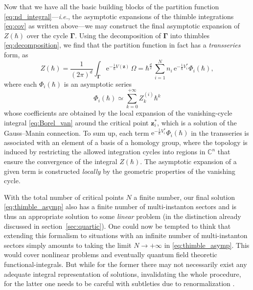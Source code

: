 \documentclass[11pt,a4paper]{article}
\def\BC{{\mathbb C}}
\newcommand{\be}{\begin{equation}}
\newcommand{\ee}{\end{equation}}
\newcommand{\rme}{{\mathrm{e}}}
\begin{document}
Now that we have all the basic building blocks of the partition function \eqref{eq:nd_integral}---\textit{i.e.}, the asymptotic expansions of the thimble integrations \eqref{eq:cov} as written above---we may construct the final asymptotic expansion of $Z (\hbar)$ over the cycle $\boldsymbol{\Gamma}$. Using the decomposition of $\boldsymbol{\Gamma}$ into thimbles \eqref{eq:decomposition}, we find that the partition function in fact has a \textit{transseries} form, as
%
\be
\label{eq:thimble_asymp}
Z (\hbar) = \frac{1}{\left( 2\pi \right)^d} \int_{\boldsymbol{\Gamma}} \rme^{- \frac{1}{\hbar} V(\boldsymbol{z})}\, \Omega = \hbar^{\frac{d}{2}}\, \sum_{i=1}^N n_i\, \rme^{- \frac{1}{\hbar} V^*_i} \Phi_i(\hbar),
\ee
%
\noindent
where each $\Phi_i(\hbar)$ is an asymptotic series
%
\be
\Phi_i (\hbar) \simeq \sum_{k=0}^{+\infty} Z^{(i)}_k \hbar^{k}
\ee
%
\noindent
whose coefficients are obtained by the local expansion of the vanishing-cycle integral \eqref{eq:Borel_van} around the critical point $\boldsymbol{z}^*_i$, which is a solution of the Gauss--Manin connection. To sum up, each term $\rme^{- \frac{1}{\hbar} V^*_i} \Phi_i(\hbar)$ in the transseries is associated with an element of a basis of a homology group, where the topology is induced by restricting the allowed integration cycles into regions in $\BC^n$ that ensure the convergence of the integral $Z(\hbar)$. The asymptotic expansion of a given term is constructed \textit{locally} by the geometric properties of the vanishing cycle.

With the total number of critical points $N$ a finite number, our final solution \eqref{eq:thimble_asymp} also has a finite number of multi-instanton sectors and is thus an appropriate solution to some \textit{linear} problem (in the distinction already discussed in section~\ref{sec:quartic}). One could now be tempted to think that extending this formalism to situations with an infinite number of multi-instanton sectors simply amounts to taking the limit $N \to + \infty$ in \eqref{eq:thimble_asymp}. This would cover nonlinear problems and eventually quantum field theoretic functional-integrals. But while for the former there may not necessarily exist any adequate integral representation of solutions, invalidating the whole procedure, for the latter one needs to be careful with subtleties due to renormalization \cite{k16}.
\end{document}
